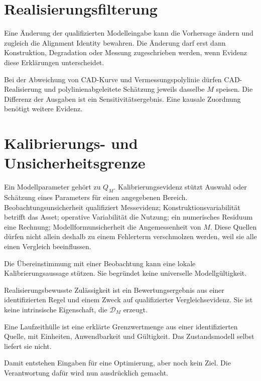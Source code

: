 \section{Realisierungsfilterung}

\begin{proposition}
\label{prop:realization-filter-principle}
Eine Änderung der qualifizierten Modelleingabe kann die Vorhersage ändern und
zugleich die Alignment Identity bewahren. Die Änderung darf erst dann
Konstruktion, Degradation oder Messung zugeschrieben werden, wenn Evidenz
diese Erklärungen unterscheidet.
\end{proposition}

Bei der Abweichung von CAD-Kurve und Vermessungspolylinie dürfen
CAD-Realisierung und polylinienabgeleitete Schätzung jeweils dasselbe \(M\)
speisen. Die Differenz der Ausgaben ist ein Sensitivitätsergebnis. Eine
kausale Zuordnung benötigt weitere Evidenz.

\section{Kalibrierungs- und Unsicherheitsgrenze}

Ein Modellparameter gehört zu \(Q_M\). Kalibrierungsevidenz stützt Auswahl
oder Schätzung eines Parameters für einen angegebenen Bereich.
Beobachtungsunsicherheit qualifiziert Messevidenz; Konstruktionsvariabilität
betrifft das Asset; operative Variabilität die Nutzung; ein numerisches
Residuum eine Rechnung; Modellformunsicherheit die Angemessenheit von \(M\).
Diese Quellen dürfen nicht allein deshalb zu einem Fehlerterm verschmolzen
werden, weil sie alle einen Vergleich beeinflussen.

Die Übereinstimmung mit einer Beobachtung kann eine lokale
Kalibrierungsaussage stützen. Sie begründet keine universelle Modellgültigkeit.

\begin{definition}
\label{def:realization-aware-admissibility}
Realisierungsbewusste Zulässigkeit ist ein Bewertungsergebnis aus einer
identifizierten Regel und einem Zweck auf qualifizierter Vergleichsevidenz.
Sie ist keine intrinsische Eigenschaft, die \(\mathcal D_M\) erzeugt.
\end{definition}

\begin{definition}[Laufzeithülle]
\label{def:runtime-envelope}
Eine Laufzeithülle ist eine erklärte Grenzwertmenge aus einer identifizierten
Quelle, mit Einheiten, Anwendbarkeit und Gültigkeit. Das Zustandsmodell selbst
liefert sie nicht.
\end{definition}

Damit entstehen Eingaben für eine Optimierung, aber noch kein Ziel. Die
Verantwortung dafür wird nun ausdrücklich gemacht.
